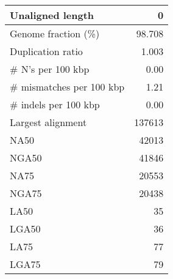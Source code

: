 \documentclass[12pt,a4paper]{article}
\begin{document}
\begin{table}[ht]
\begin{center}
\begin{tabular}{|l*{1}{|r}|}
Unaligned length & 0 \\ \hline
Genome fraction (\%) & 98.708 \\ \hline
Duplication ratio & 1.003 \\ \hline
\# N's per 100 kbp & 0.00 \\ \hline
\# mismatches per 100 kbp & 1.21 \\ \hline
\# indels per 100 kbp & 0.00 \\ \hline
Largest alignment & 137613 \\ \hline
NA50 & 42013 \\ \hline
NGA50 & 41846 \\ \hline
NA75 & 20553 \\ \hline
NGA75 & 20438 \\ \hline
LA50 & 35 \\ \hline
LGA50 & 36 \\ \hline
LA75 & 77 \\ \hline
LGA75 & 79 \\ \hline
\end{tabular}
\end{center}
\end{table}
\end{document}
